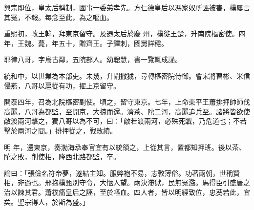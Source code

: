 \begin{pinyinscope}
 興宗即位，皇太后稱制，國事一委弟孝先。方仁德皇后以馮家奴所誣被害，樸屢言其冤，不報。每念至此，為之嘔血。



 重熙初，改王韓，拜東京留守。及遷太后於慶
 州，樸徙王楚，升南院樞密使。四年，王魏。薨，年五十，贈齊王。子鐸刺，國舅詳穩。



 耶律八哥，字烏古鄰，五院部人。幼聰慧，書一覽輒成誦。



 統和中，以世業為本部吏。未幾，升閘撒狘，尋轉樞密院侍御。會宋將曹彬、米信侵燕，八哥以扈從有功，擢上京留守。



 開泰四年，召為北院樞密副使。頃之，留守東京。七年，上命東平王蕭排押帥師伐高麗，八哥為都監，至開京，大掠而還。濟茶、陀二河，高麗追兵至。諸將皆欲使敵渡兩河擊之，獨八哥以為不可，曰：「敵若渡兩河，必殊死戰，乃危道也；不若擊於兩河之間。」排押從之，戰敗績。



 明
 年，還東京，奏渤海承奉官宜有以統領之，上從其言，置都知押班。後以茶、陀之敗，削使相，降西北路都監，卒。



 論曰：「張儉名符帝夢，遂結主知。服弊袍不易，志敦薄俗。功著兩朝，世稱賢相，非過也。邢抱樸甄別守令，大愜人望。兩決滯獄，民無冤濫。馬得臣引盛唐之治以諫其君。蕭樸痛皇后之誣，至於嘔血。四人者，皆以明經致位，忠葵若此，宜矣。聖宗得人，於斯為盛。」



\end{pinyinscope}